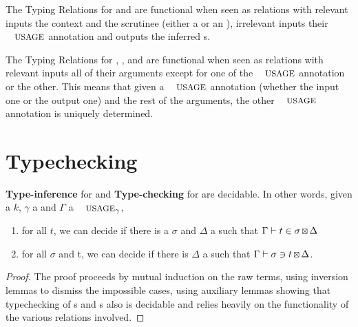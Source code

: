 \begin{lemma}The Typing Relations for \Var{} and \Inferable{} are functional
when seen as relations with relevant inputs the context and the scrutinee
(either a \Var{} or an \Inferable{}), irrelevant inputs their $\Usages{}$
annotation and outputs the inferred \Type{}s.
\end{lemma}

\begin{lemma}The Typing Relations for \Var{}, \Inferable{}, \Checkable{}
and \Env{} are functional when seen as relations with relevant inputs all
of their arguments except for one of the $\Usages{}$ annotation or the other.
This means that given a $\Usages{}$ annotation (whether the input one or the
output one) and the rest of the arguments, the other $\Usages{}$ annotation
is uniquely determined.
\end{lemma}


\section{Typechecking}\label{sec:typechecking}

\begin{theorem}
\label{theorem:typechecking}
\textbf{Type-inference} for \Inferable{} and \textbf{Type-checking} for \Checkable{} are
decidable. In other words, given a \Nat{} $k$, \ensuremath{\gamma} a  and
\ensuremath{\Gamma} a $\Usages{\ensuremath{\gamma}}$,
\begin{enumerate}
  \item for all  $t$, we can decide if there is
        a \Type{} $\ensuremath{\sigma}$ and \ensuremath{\Delta} a \Usages{\ensuremath{\gamma}} such that $\Gamma \vdash t \in \sigma \,{\scriptstyle \boxtimes{}}\,{} \Delta$
  \item for all \Type{} \ensuremath{\sigma} and  t, we can decide if
        there is \ensuremath{\Delta} a \Usages{\ensuremath{\gamma}} such that $\Gamma \vdash \sigma \ni t \,{\scriptstyle \boxtimes{}}\,{} \Delta$.
\end{enumerate}
\end{theorem}
\begin{proof}
The proof proceeds by mutual induction on the raw terms, using inversion
lemmas to dismiss the impossible cases, using auxiliary lemmas showing
that typechecking of \Var{}s and \Pattern{}s also is decidable and relies
heavily on the functionality of the various relations involved.
\end{proof}

